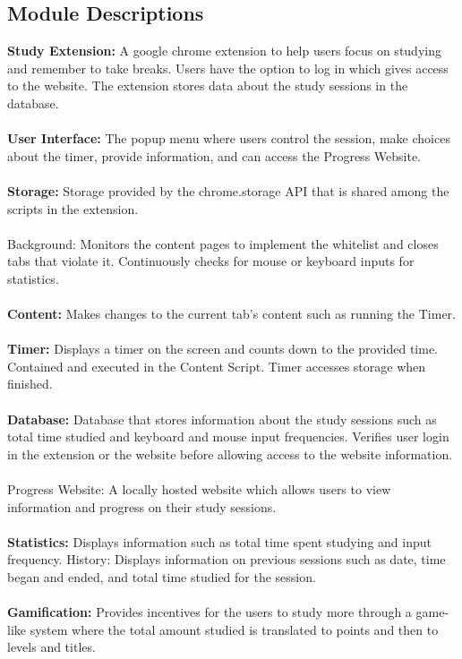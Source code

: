 \documentclass[12pt]{article}
\begin{document}
\subsection{Module Descriptions}
\textbf{Study Extension:} A google chrome extension to help users focus on studying and remember to take breaks. Users have the option to log in which gives access to the website. The extension stores data about the study sessions in the database. \\\\
\textbf{User Interface:} The popup menu where users control the session, make choices about the timer, provide information, and can access the Progress Website.\\\\
\textbf{Storage:} Storage provided by the chrome.storage API that is shared among the scripts in the extension.\\\\
Background: Monitors the content pages to implement the whitelist and closes tabs that violate it. Continuously checks for mouse or keyboard inputs for statistics.\\\\
\textbf{Content:} Makes changes to the current tab's content such as running the Timer.\\\\
\textbf{Timer:} Displays a timer on the screen and counts down to the provided time. Contained and executed in the Content Script. Timer accesses storage when finished.\\\\
\textbf{Database:} Database that stores information about the study sessions such as total time studied and keyboard and mouse input frequencies. Verifies user login in the extension or the website before allowing access to the website information. \\\\
Progress Website: A locally hosted website which allows users to view information and progress on their study sessions. \\\\
\textbf{Statistics:} Displays information such as total time spent studying and input frequency.
History: Displays information on previous sessions such as date, time began and ended, and total time studied for the session. \\\\
\textbf{Gamification:} Provides incentives for the users to study more through a game-like system where the total amount studied is translated to points and then to levels and titles.\\\\
\end{document}
